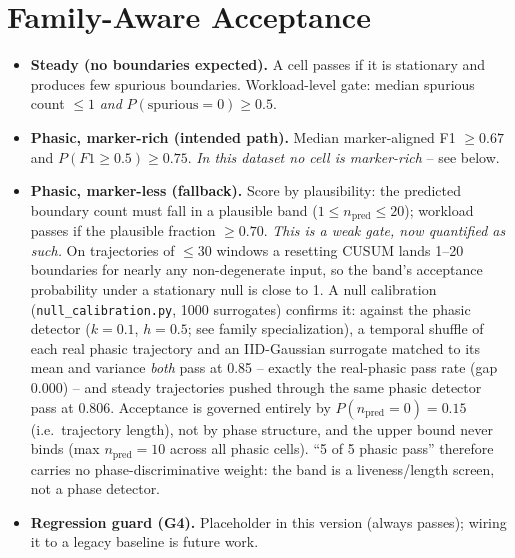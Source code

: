 \documentclass[conference]{IEEEtran}
\begin{document}
\section{Family-Aware Acceptance}
\begin{itemize}
  \item \textbf{Steady (no boundaries expected).} A cell passes if it is
        stationary and produces few spurious boundaries. Workload-level gate:
        median spurious count $\le 1$ \emph{and} $P(\text{spurious}=0)\ge 0.5$.
  \item \textbf{Phasic, marker-rich (intended path).} Median marker-aligned F1
        $\ge 0.67$ and $P(F1 \ge 0.5) \ge 0.75$. \emph{In this dataset no cell is
        marker-rich} -- see below.
  \item \textbf{Phasic, marker-less (fallback).} Score by plausibility: the
        predicted boundary count must fall in a plausible band
        ($1 \le n_{\text{pred}} \le 20$); workload passes if the plausible
        fraction $\ge 0.70$. \emph{This is a weak gate, now quantified as such.}
        On trajectories of $\le 30$ windows a resetting CUSUM lands 1--20
        boundaries for nearly any non-degenerate input, so the band's acceptance
        probability under a stationary null is close to 1. A null calibration
        (\texttt{null\_calibration.py}, 1000 surrogates) confirms it: against the
        phasic detector ($k{=}0.1$, $h{=}0.5$; see family specialization), a
        temporal shuffle of each real phasic trajectory and an IID-Gaussian
        surrogate matched to its mean and variance \emph{both} pass at 0.85 --
        exactly the real-phasic pass rate (gap 0.000) -- and steady trajectories
        pushed through the same phasic detector pass at 0.806. Acceptance is
        governed entirely by $P(n_{\text{pred}}{=}0)=0.15$ (i.e.\ trajectory
        length), not by phase structure, and the upper bound never binds
        (max $n_{\text{pred}}=10$ across all phasic cells). ``5 of 5 phasic
        pass'' therefore carries no phase-discriminative weight: the band is a
        liveness/length screen, not a phase detector.
  \item \textbf{Regression guard (G4).} Placeholder in this version (always
        passes); wiring it to a legacy baseline is future work.
\end{itemize}
\end{document}
